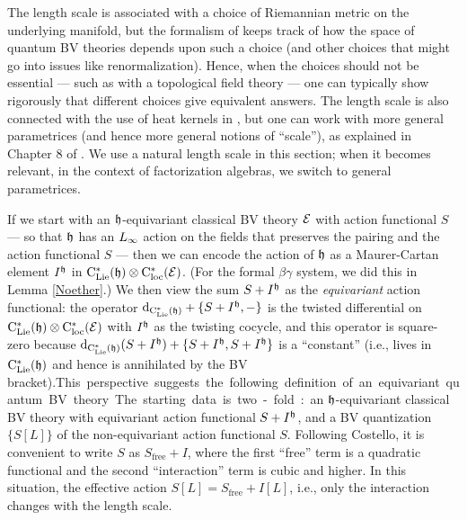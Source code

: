\begin{rmk}
The length scale is associated with a choice of Riemannian metric on the underlying manifold,
but the formalism of \cite{CosBook} keeps track of how the space of quantum BV theories depends upon such a choice 
(and other choices that might go into issues like renormalization).
Hence, when the choices should not be essential --- such as with a topological field theory --- one can typically show rigorously that different choices give equivalent answers.
The length scale is also connected with the use of heat kernels in \cite{CosBook},
but one can work with more general parametrices (and hence more general notions of ``scale''),
as explained in Chapter 8 of \cite{CG}.
We use a natural length scale in this section; 
when it becomes relevant, in the context of factorization algebras, we switch to general parametrices.
\end{rmk}

If we start with an $\mathfrak h$-equivariant classical BV theory $\mathcal E$ with action functional $S$ --- so that $\mathfrak h$ has an $\L8$ action on the fields that preserves the pairing and the action functional $S$ --- then we can encode the action of $\mathfrak h$ as a Maurer-Cartan element $I^\mathfrak h$ in ${\rm C}_{\rm Lie}^*(\mathfrak h) \otimes {\rm C}^*_{\rm loc}(\mathcal E)$.
(For the formal $\beta\gamma$ system, we did this in Lemma \ref{Noether}.)
We then view the sum $S + I^\mathfrak h$ as the \emph{equivariant} action functional:
the operator ${\rm d}_{{\rm C}_{\rm Lie}^*(\mathfrak h)} + \{S+ I^\mathfrak h,-\}$ is the twisted differential on ${\rm C}_{\rm Lie}^*(\mathfrak h) \otimes {\rm C}^*_{\rm loc}(\mathcal E)$ with $I^\mathfrak h$ as the twisting cocycle,
and this operator is square-zero because ${\rm d}_{{\rm C}_{\rm Lie}^*(\mathfrak h)}(S + I^\mathfrak h) + \{S + I^\mathfrak h, S+ I^\mathfrak h\}$ is a ``constant'' (i.e., lives in ${\rm C}_{\rm Lie}^*(\mathfrak h)$ and hence is annihilated by the BV bracket).\si

This perspective suggests the following definition of an equivariant quantum BV theory.
The starting data is two-fold:
an $\mathfrak h$-equivariant classical BV theory with equivariant action functional $S+I^\mathfrak h$, 
and a BV quantization $\{S[L]\}$ of the non-equivariant action functional $S$.
Following Costello, it is convenient to write $S$ as $S_{\text{free}} + I$, 
where the first ``free'' term is a quadratic functional and the second ``interaction'' term is cubic and higher.
In this situation, the effective action $S[L] = S_{\text{free}} + I[L]$, 
i.e., only the interaction changes with the length scale.

